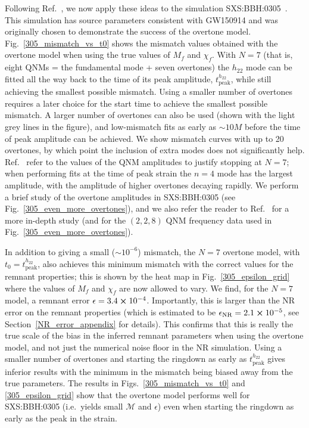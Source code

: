 Following Ref.~\cite{Giesler:2019uxc}, we now apply these ideas to the simulation SXS:BBH:0305~\cite{Lovelace:2016uwp}.
This simulation has source parameters consistent with GW150914 and was originally chosen to demonstrate the success of the overtone model. 
Fig.~\ref{305_mismatch_vs_t0} shows the mismatch values obtained with the overtone model when using the true values of $M_f$ and $\chi_f$.
With $N=7$ (that is, eight QNMs = the fundamental mode + seven overtones) the $h_{22}$ mode can be fitted all the way back to the time of its peak amplitude, $t_{\mathrm{peak}}^{h_{22}}$, while still achieving the smallest possible mismatch.
Using a smaller number of overtones requires a later choice for the start time to achieve the smallest possible mismatch.
A larger number of overtones can also be used (shown with the light grey lines in the figure), and low-mismatch fits as early as $\sim 10M$ before the time of peak amplitude can be achieved.
We show mismatch curves with up to 20 overtones, by which point the inclusion of extra modes does not significantly help.
Ref.~\cite{Giesler:2019uxc} refer to the values of the QNM amplitudes to justify stopping at $N=7$; when performing fits at the time of peak strain the $n=4$ mode has the largest amplitude, with the amplitude of higher overtones decaying rapidly. 
We perform a brief study of the overtone amplitudes in SXS:BBH:0305 (see Fig.~\ref{305_even_more_overtones}), and we also refer the reader to Ref.~\cite{Forteza:2021wfq} for a more in-depth study (and for the $(2,2,8)$ QNM frequency data used in Fig.~\ref{305_even_more_overtones}).

In addition to giving a small ($\sim 10^{-6}$) mismatch, the $N=7$ overtone model, with $t_0 = t_{\mathrm{peak}}^{h_{22}}$, also achieves this minimum mismatch with the correct values for the remnant properties; this is shown by the heat map in Fig.~\ref{305_epsilon_grid} where the values of $M_f$ and $\chi_f$ are now allowed to vary. 
We find, for the $N=7$ model, a remnant error $\epsilon = 3.4 \cross 10^{-4}$. 
Importantly, this is larger than the NR error on the remnant properties (which is estimated to be $\epsilon_{\mathrm{NR}} = 2.1 \cross 10^{-5}$, see Section~\ref{NR_error_appendix} for details). This confirms that this is really the true scale of the bias in the inferred remnant parameters when using the overtone model, and not just the numerical noise floor in the NR simulation.
Using a smaller number of overtones and starting the ringdown as early as $t_{\mathrm{peak}}^{h_{22}}$ gives inferior results with the minimum in the mismatch being biased away from the true parameters.
The results in Figs.~\ref{305_mismatch_vs_t0} and \ref{305_epsilon_grid} show that the overtone model performs well for SXS:BBH:0305 (i.e.\ yields small $\mathcal{M}$ and $\epsilon$) even when starting the ringdown as early as the peak in the strain.

